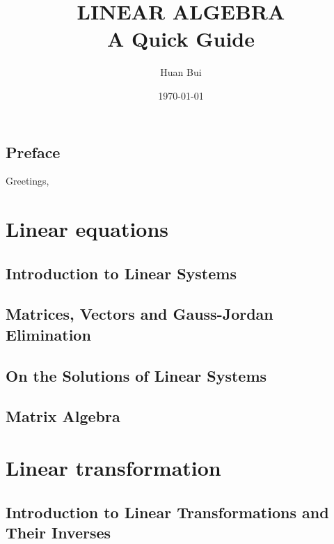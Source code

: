 \documentclass{article}
\theoremstyle{definition}
\begin{document}
	\begin{titlepage}\centering
		\clearpage
		\title{\textsc{\bf{LINEAR ALGEBRA}}\\\smallskip A Quick Guide\\}
		\author{\bigskip Huan Bui}
		\date{\today}
		\maketitle
		\thispagestyle{empty}
	\end{titlepage}

\newpage

\subsection*{Preface}

Greetings,\\


\newpage
\tableofcontents
\newpage

\section{Linear equations}
\subsection{Introduction to Linear Systems}
\subsection{Matrices, Vectors and Gauss-Jordan Elimination}
\subsection{On the Solutions of Linear Systems}
\subsection{Matrix Algebra}

\newpage


\section{Linear transformation}
\subsection{Introduction to Linear Transformations and Their Inverses}
\end{document}

